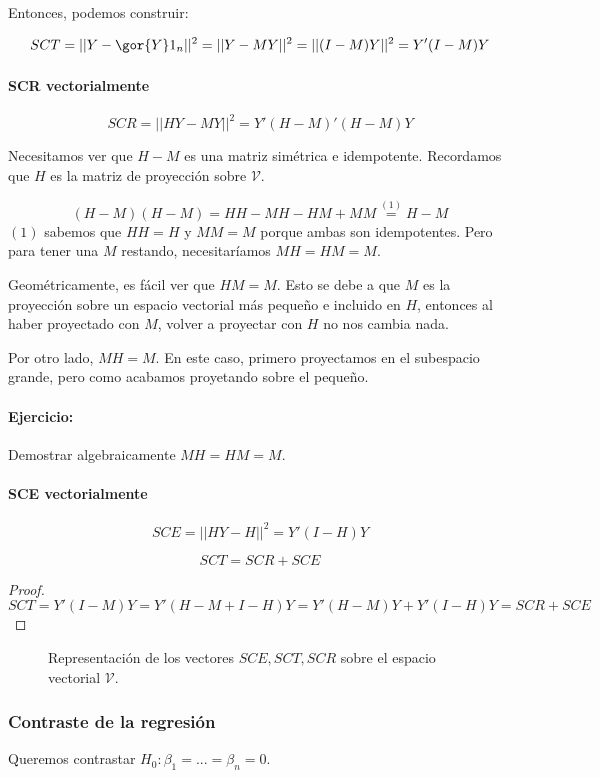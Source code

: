 Entonces, podemos construir:

\[
SCT = ||Y - \gor{Y}1_n||^2  = || Y-MY||^2 = ||(I-M) Y||^2 = Y'(I-M)Y
\]

\paragraph{SCR vectorialmente}
\[
SCR = || HY-MY||^2 = Y'(H-M)'(H-M)Y
\]

Necesitamos ver que $H-M$ es una matriz simétrica e idempotente. Recordamos que $H$ es la matriz de proyección sobre $\mathcal{V}$.

\[
(H-M)(H-M) = HH - MH - HM + MM \overset{(1)}{=} H - M
\]
$(1)$ sabemos que $HH = H$ y $MM=M$ porque ambas son idempotentes. Pero para tener una $M$ restando, necesitaríamos $MH = HM = M$.

Geométricamente, es fácil ver que $HM=M$. Esto se debe a que $M$ es la proyección sobre un espacio vectorial más pequeño e incluido en $H$, entonces al haber proyectado con $M$, volver a proyectar con $H$ no nos cambia nada.

Por otro lado, $MH = M$. En este caso, primero proyectamos en el subespacio grande, pero como acabamos proyetando sobre el pequeño.

\paragraph{Ejercicio: } Demostrar algebraicamente $MH=HM=M$.

\paragraph{SCE vectorialmente}
\[SCE = ||HY-H||^2 = Y'(I-H)Y\]

\begin{prop}
\[SCT = SCR + SCE\]
\end{prop}

\begin{proof}
\[SCT = Y'(I-M)Y = Y'(H-M+I-H)Y = Y'(H-M)Y + Y'(I-H)Y = SCR + SCE\]
\end{proof}

\begin{figure}[hbtp]
	\centering
	\caption{Representación de los vectores $SCE,SCT,SCR$ sobre el espacio vectorial $\mathcal{V}$.}
\end{figure}

\subsubsection{Contraste de la regresión}
Queremos contrastar $H_0 : β_1 = ... = β_n = 0$.


